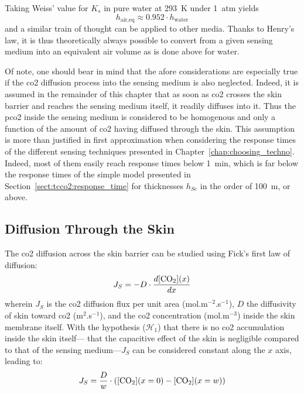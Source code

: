 Taking Weiss' value for $K_s$ in pure water at 293~K under 1~atm yields
\begin{equation}
	h_\text{air,eq} \approx 0.952 \cdot h_\text{water}
\end{equation}
and a similar train of thought can be applied to other media. Thanks to Henry's law, it is thus theoretically always possible to convert from a given sensing medium into an equivalent air volume as is done above for water.

Of note, one should bear in mind that the afore considerations are especially true if the \gls{co2} diffusion process into the sensing medium is also neglected. Indeed, it is assumed in the remainder of this chapter that as soon as \gls{co2} crosses the skin barrier and reaches the sensing medium itself, it readily diffuses into it. Thus the \gls{pco2} inside the sensing medium is considered to be homogenous and only a function of the amount of \gls{co2} having diffused through the skin. This assumption is more than justified in first approximation when considering the response times of the different sensing techniques presented in Chapter~\ref{chap:choosing_techno}. Indeed, most of them easily reach response times below 1~min, which is far below the response times of the simple model presented in Section~\ref{sect:tcco2:response_time} for thicknesses $h_{Se}$ in the order of 100~\textmu{}m, or above.

\subsection{Diffusion Through the Skin}\label{sect:tcco2:diffusion_dynamic}

The \gls{co2} diffusion across the skin barrier can be studied using Fick's first law of diffusion:
\begin{equation}
	J_S = -D \cdot \frac{d \ce{[CO_2]}(x)}{dx}
\end{equation}
wherein $J_S$ is the \gls{co2} diffusion flux per unit area (mol.m$^{-2}$.s$^{-1}$), $D$ the diffusivity of skin toward \gls{co2} (m$^2$.s$^{-1}$), and \ce{[CO_2]} the \gls{co2} concentration (mol.m$^{-3}$) inside the skin membrane itself. With the hypothesis ($\mathcal{H}_1$) that there is no \gls{co2} accumulation inside the skin itself---\ie{} that the capacitive effect of the skin is negligible compared to that of the sensing medium---$J_S$ can be considered constant along the $x$ axis, leading to:
\begin{equation}\label{eq:tcco2:fick_int}
	J_S = \frac{D}{w} \cdot \left( \ce{[CO_2]}(x=0) - \ce{[CO_2]}(x=w)  \right)
\end{equation}

